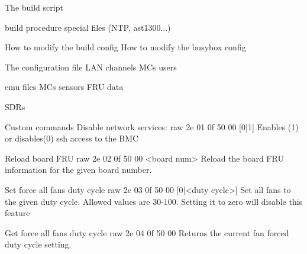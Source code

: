 
The build script

build procedure
  special files (NTP, ast1300...)

How to modify the build config
How to modify the busybox config

The configuration file
  LAN channels
  MCs
  users

emu files
MCs
  sensors
  FRU data

SDRs

Custom commands
  Disable network services:
    raw 2e 01 0f 50 00 [0|1]
  Enables (1) or disables(0) ssh access to the BMC

  Reload board FRU
    raw 2e 02 0f 50 00 <board num>
  Reload the board FRU information for the given board number.

  Set force all fans duty cycle
    raw 2e 03 0f 50 00 [0|<duty cycle>]
  Set all fans to the given duty cycle.  Allowed values are 30-100.
  Setting it to zero will disable this feature

  Get force all fans duty cycle
    raw 2e 04 0f 50 00
  Returns the current fan forced duty cycle setting.
